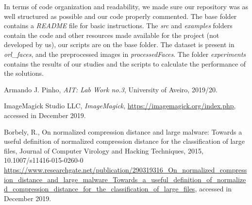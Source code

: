 \documentclass[12pt]{article}
\begin{document}
In terms of code organization and readability, we made sure our repository was as well structured as possible and our code properly commented.
The base folder contains a \textit{README} file for basic instructions.
The \textit{src} and \textit{examples} folders contain the code and other resources made available for the project (not developed by us), our scripts are on the base folder.
The dataset is present in \textit{orl\_faces}, and the preprocessed images in \textit{processedFaces}.
The folder \textit{experiments} contains the results of our studies and the scripts to calculate the performance of the solutions.

\begin{thebibliography}{9} %
  

    Armando J. Pinho,
    \textit{AIT: Lab Work no.3},
    University of Aveiro,
    2019/20.
  
    ImageMagick Studio LLC,
    \textit{ImageMagick},
    \url{https://imagemagick.org/index.php},
    accessed in December 2019.

    Borbely, R.,
    On normalized compression distance and large malware: Towards a
    useful definition of normalized compression distance for the classification of
    large files,
    Journal of Computer Virology and Hacking Techniques,
    2015,
    10.1007/s11416-015-0260-0
    \url{https://www.researchgate.net/publication/290319316_On_normalized_compression_distance_and_large_malware_Towards_a_useful_definition_of_normalized_compression_distance_for_the_classification_of_large_files},
    accessed in December 2019.
  
\end{thebibliography}

\clearpage
\end{document}
